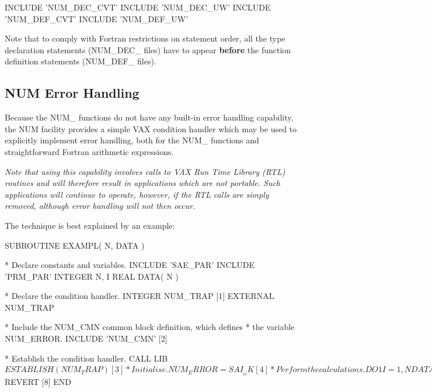 \documentclass[11pt,nolof]{starlink}
\providecommand{\name}[1]{#1}
\begin{document}
\begin{terminalv}
INCLUDE 'NUM_DEC_CVT'
INCLUDE 'NUM_DEC_UW'
INCLUDE 'NUM_DEF_CVT'
INCLUDE 'NUM_DEF_UW'
\end{terminalv}

Note that to comply with Fortran restrictions on statement order, all the
type declaration statements (\name{NUM\_DEC\_} files) have to appear \textbf{before} the function definition statements (\name{NUM\_DEF\_} files).

\subsection{\name{NUM} Error Handling}
\label{section:num:error}

Because the \name{NUM\_} functions do not have any built-in error handling
capability, the \name{NUM} facility provides a simple \name{VAX} condition
handler which may be used to explicitly implement error handling, both for
the \name{NUM\_} functions and straightforward Fortran arithmetic
expressions.

\emph{Note that using this capability involves calls to \name{VAX} Run
Time Library (\name{RTL}) routines and will therefore result in applications
which are not portable.
Such applications will continue to operate, however, if the \name{RTL} calls
are simply removed, although error handling will not then occur.
}

The technique is best explained by an example:

\begin{small}
\begin{terminalv}
      SUBROUTINE EXAMPL( N, DATA )

*   Declare constants and variables.
      INCLUDE 'SAE_PAR'
      INCLUDE 'PRM_PAR'
      INTEGER N, I
      REAL DATA( N )

*   Declare the condition handler.
      INTEGER NUM_TRAP                            [1]
      EXTERNAL NUM_TRAP

*   Include the NUM_CMN common block definition, which defines
*   the variable NUM_ERROR.
      INCLUDE 'NUM_CMN'                           [2]

*   Establish the condition handler.
      CALL LIB$ESTABLISH( NUM_TRAP )              [3]

*   Initialise.
      NUM_ERROR = SAI__OK                         [4]

*   Perform the calculations.
      DO 1 I = 1, N
         DATA( I ) = 1.0 / ( DATA( I ) ** 2 )     [5]

*   Check if an error occurred.
         IF( NUM_ERROR .NE. SAI__OK ) THEN        [6]

*   If so, reset the NUM_ERROR flag and define the result.
            NUM_ERROR = SAI__OK                   [7]
            DATA( I ) = VAL__BADR
         ENDIF
    1 CONTINUE

*   Remove the condition handler and exit the routine.
      CALL LIB$REVERT                             [8]
      END
\end{terminalv}
\end{small}
\end{document}
